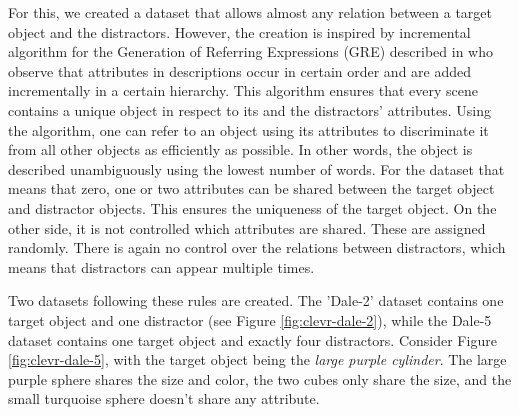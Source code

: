 For this, we created a dataset that allows almost any relation between a target object and the distractors.
However, the creation is inspired by incremental algorithm for the Generation of Referring Expressions (GRE) described in \citep{Dale1995} who observe that attributes in descriptions occur in certain order and are added incrementally in a certain hierarchy.
This algorithm ensures that every scene contains a unique object in respect to its and the distractors' attributes.
Using the algorithm, one can refer to an object using its attributes to discriminate it from all other objects as efficiently as possible.
In other words, the object is described unambiguously using the lowest number of words.
For the dataset that means that zero, one or two attributes can be shared between the target object and distractor objects.
This ensures the uniqueness of the target object.
On the other side, it is not controlled which attributes are shared.
These are assigned randomly.
There is again no control over the relations between distractors, which means that distractors can appear multiple times.

Two datasets following these rules are created.
The 'Dale-2' dataset contains one target object and one distractor (see Figure \ref{fig:clevr-dale-2}), while the Dale-5 dataset contains one target object and exactly four distractors.
Consider Figure \ref{fig:clevr-dale-5}, with the target object being the \emph{large purple cylinder}. The large purple sphere shares the size and color, the two cubes only share the size, and the small turquoise sphere doesn't share any attribute.

